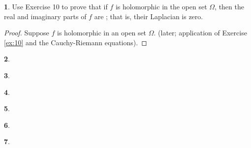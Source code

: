 \documentclass[12pt,a4]{article}
\theoremstyle{definition}
\newtheorem{exercise}{}
\begin{document}
	\begin{exercise}
		Use Exercise 10 to prove that if $f$ is holomorphic in the open set $\Omega$, then the real and imaginary parts of $f$ are ; that is, their Laplacian is zero. 
	\end{exercise}
	\begin{proof}
		Suppose $f$ is holomorphic in an open set $\Omega$. (later; application of Exercise \hyperref[ex:10]{\ref{ex:10}} and the Cauchy-Riemann equations).
	\end{proof}

\begin{exercise}
	
\end{exercise}

\begin{exercise}
	
\end{exercise}

\begin{exercise}
	
\end{exercise}

\begin{exercise}
	
\end{exercise}

\begin{exercise}
	
\end{exercise}

\begin{exercise}
	
\end{exercise}
\end{document}
